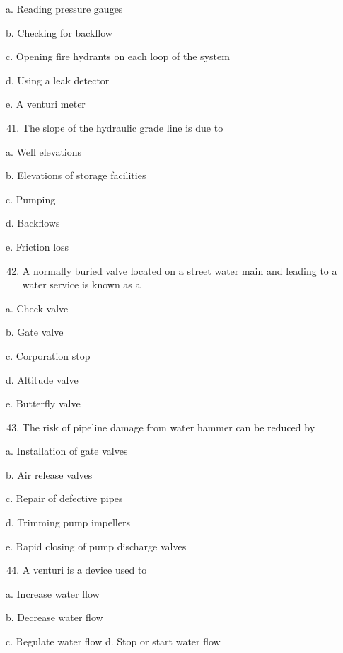 \documentclass[10pt]{article}
\begin{document}
\begin{enumerate}
\begin{enumerate}
a. Reading pressure gauges

b. Checking for backflow

c. Opening fire hydrants on each loop of the system

d. Using a leak detector

e. A venturi meter

\begin{enumerate}
  \setcounter{enumi}{40}
  \item The slope of the hydraulic grade line is due to
\end{enumerate}

a. Well elevations

b. Elevations of storage facilities

c. Pumping

d. Backflows

e. Friction loss

\begin{enumerate}
  \setcounter{enumi}{41}
  \item A normally buried valve located on a street water main and leading to a water service is known as a
\end{enumerate}

a. Check valve

b. Gate valve

c. Corporation stop

d. Altitude valve

e. Butterfly valve

\begin{enumerate}
  \setcounter{enumi}{42}
  \item The risk of pipeline damage from water hammer can be reduced by
\end{enumerate}

a. Installation of gate valves

b. Air release valves

c. Repair of defective pipes

d. Trimming pump impellers

e. Rapid closing of pump discharge valves

\begin{enumerate}
  \setcounter{enumi}{43}
  \item A venturi is a device used to
\end{enumerate}

a. Increase water flow

b. Decrease water flow

c. Regulate water flow d. Stop or start water flow


\end{enumerate}
\end{enumerate}
\end{document}
